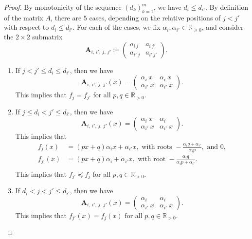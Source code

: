 \documentclass[11pt,a4paper]{amsart}
\theoremstyle{results}
\theoremstyle{definitions}
\def\R{\mathbb{R}}
\begin{document}
\begin{proof}
    By monotonicity of the sequence $(d_k)_{k=1}^{m}$, we have $d_i \leqslant d_{i'}$. 
    By definition of the matrix $A$, there are $5$ cases, depending on the relative positions of $j < j'$ with respect to $d_i \leqslant d_{i'}$. For each of the cases, we fix $\alpha_{i}, \alpha_{i'} \in \R_{\geqslant 0}$, and consider the $2 \times 2$ submatrix 
    \[
    \mathbf{A}_{i, \:i',\: j,\:j'} \coloneqq 
    \begin{pmatrix}
        a_{i\: j} & a_{i \: j'} \\
        a_{i' \: j} & a_{i' \: j'}
    \end{pmatrix}. 
    \]
    \begin{enumerate}[\normalfont(i), leftmargin=18pt]
        \item If $j < j' \leqslant d_i \leqslant d_{i'}$, then we have 
        \[
        \mathbf{A}_{i, \:i',\: j,\:j'}(x) = 
        \begin{pmatrix}
        \alpha_i \: x & \alpha_i \: x  \\
        \alpha_{i'} \: x & \alpha_{i'} \: x
        \end{pmatrix}.
        \]
        This implies that $f_{j} = f_{j'}$ for all $p, q \in \R_{> 0}$. 
        \item If $j \leqslant  d_i < j' \leqslant d_{i'}$, then we have 
        \[
        \mathbf{A}_{i, \:i',\: j,\:j'}(x) = 
        \begin{pmatrix}
        \alpha_i \: x & \alpha_i  \\
        \alpha_{i'} \: x & \alpha_{i'} \: x
        \end{pmatrix}.
        \]
        This implies that 
        \begin{align*}
            f_{j}(x) &= (px + q) \alpha_ix + \alpha_{i'} x, \text{ with roots } - \frac{\alpha_{i}q + \alpha_{i'}}{\alpha_{i}p}, \text{ and }0,\\
            f_{j'}(x) &= (px + q) \alpha_i + \alpha_{i'} x, \text{ with root } - \frac{\alpha_{i} q}{\alpha_{i}p + \alpha_{i'}}.\\
        \end{align*}
        This implies that $f_{j'} \preceq f_{j}$ for all $p, q \in \R_{> 0}$. 

        \item If $d_{i} < j < j' \leqslant d_{i'}$, then we have
        \[
        \mathbf{A}_{i, \:i',\: j,\:j'}(x) = 
        \begin{pmatrix}
        \alpha_i  & \alpha_i  \\
        \alpha_{i'} \: x & \alpha_{i'} \: x
        \end{pmatrix}.
        \]
        This implies that $f_{j'}(x) = f_{j}(x)$ for all $p, q \in \R_{> 0}$. 


\end{enumerate}
\end{proof}
\end{document}
